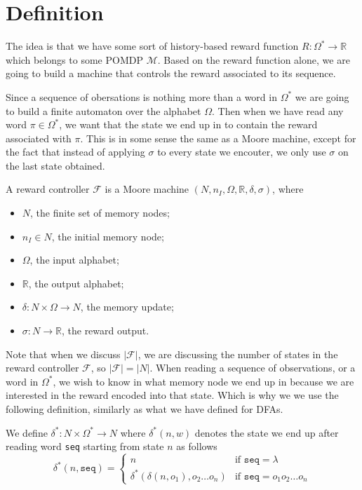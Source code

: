 \section{Definition}

The idea is that we have some sort of history-based reward function $R:\Omega^*\to\mathbb{R}$ which belongs to some POMDP $\mathcal{M}$. Based on the reward function alone, we are going to build a machine that controls the reward associated to its sequence. 

Since a sequence of obersations is nothing more than a word in $\Omega^*$ we are going to build a finite automaton over the alphabet $\Omega$. Then when we have read any word $\pi\in\Omega^*$, we want that the state we end up in to contain the reward associated with $\pi$. This is in some sense the same as a Moore machine, except for the fact that instead of applying $\sigma$ to every state we encouter, we only use $\sigma$ on the last state obtained. 

\begin{definition}
	A reward controller $\mathcal{F}$ is a Moore machine $(N,n_I, \Omega, \mathbb{R}, \delta, \sigma)$, where
	\begin{itemize}
		\item $N$, the finite set of memory nodes;
		\item $n_I\in N$, the initial memory node;
		\item $\Omega$, the input alphabet;
		\item $\mathbb{R}$, the output alphabet;
		\item $\delta: N \times \Omega \to N$, the memory update;
		\item $\sigma: N \to \mathbb{R}$, the reward output. 
	\end{itemize}
\end{definition}

Note that when we discuss $|\mathcal{F}|$, we are discussing the number of states in the reward controller $\mathcal{F}$, so $|\mathcal{F}|=|N|$. When reading a sequence of observations, or a word in $\Omega^*$, we wish to know in what memory node we end up in because we are interested in the reward encoded into that state. Which is why we we use the following definition, similarly as what we have defined for DFAs.

\begin{definition}
We define $\delta^*:N\times\Omega^*\to N$ where $\delta^*(n,w)$ denotes the state we end up after reading word \texttt{seq} starting from state $n$ as follows
\begin{equation*}
\delta^*(n,\texttt{seq})=\begin{cases}
	n &\text{if } \texttt{seq}=\lambda \\
	\delta^*(\delta(n,o_1),o_2\dots o_n) & \text{if } \texttt{seq}=o_1 o_2\dots o_n
	\end{cases}
\end{equation*}
\label{d:delta_star_rc}
\end{definition}

